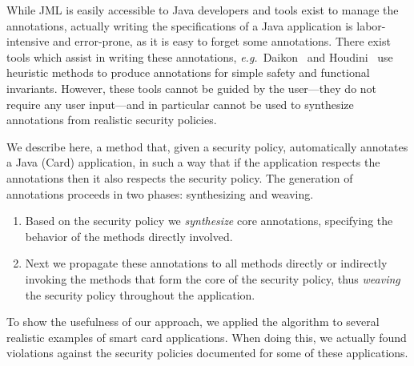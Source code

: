 
While JML is easily accessible to Java developers and tools exist
to manage the annotations, actually writing
the specifications of a Java application is labor-intensive and
error-prone, as it is easy to forget some annotations. There
exist tools which assist in writing these annotations,
\emph{e.g.}~Daikon~\cite{ErnstCGN2001:TSE} and Houdini~\cite{FlanaganL01}
use heuristic methods to produce annotations for simple safety and
functional invariants.  However, these tools cannot be guided by the
user---they do not require any user input---and in particular cannot
be used to synthesize annotations from realistic security policies.

We describe here, a method that, given a security policy,
automatically annotates a Java (Card) application, in such a way that
if the application respects the annotations then it also respects the
security policy. The generation of annotations proceeds in two phases:
synthesizing and weaving.
\begin{enumerate}
\item Based on the security policy we \emph{synthesize} core annotations, 
specifying the behavior of the methods directly involved.
\item Next we propagate these annotations to all methods directly or
indirectly invoking the methods that form the core of the security
policy, thus \emph{weaving} the security policy throughout the
application. 
\end{enumerate} 

To show the usefulness of our approach, we applied the algorithm to
several realistic examples of smart card applications. When doing
this, we actually found violations against the security policies
documented for some of these applications.







